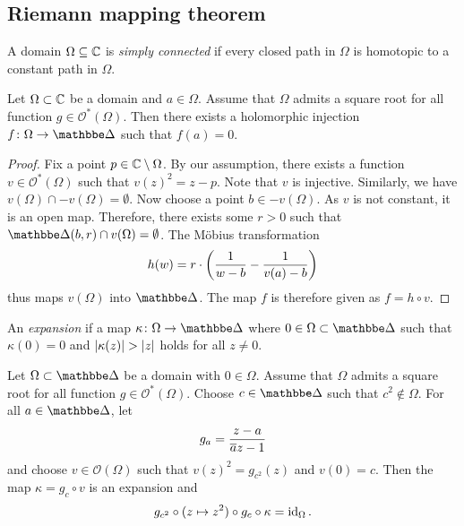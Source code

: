 \newpage

\subsection{Riemann mapping theorem}


\begin{definicija}
A domain $\Omega \subseteq \mathbb{C}$ is
\emph{simply connected} if every closed
path in $\Omega$ is homotopic to a constant path in $\Omega$.
\end{definicija}

\begin{lema}
\label{hol:lm:inj_exis}
Let $\Omega \subset \mathbb{C}$ be a domain and $a \in \Omega$. Assume that
$\Omega$ admits a square root for all function
$g \in \mathcal{O}^*(\Omega)$. Then there exists a holomorphic
injection $f \colon \Omega \to \dsk$ such that $f(a) = 0$.
\end{lema}

\begin{proof}
Fix a point $p \in \mathbb{C} \setminus \Omega$. By our assumption, there
exists a function $v \in \mathcal{O}^*(\Omega)$ such that
$v(z)^2 = z-p$. Note that $v$ is injective. Similarly, we have
$v(\Omega) \cap -v(\Omega) = \emptyset$. Now choose a point
$b \in -v(\Omega)$. As $v$ is not constant, it is an open map.
Therefore, there exists some $r > 0 $ such that
$\dsk(b, r) \cap v(\Omega) = \emptyset$. The Möbius transformation
\[
h(w) = r \cdot \left(\frac{1}{w-b} - \frac{1}{v(a)-b}\right)
\]
thus maps $v(\Omega)$ into $\dsk$. The map $f$ is therefore given
as $f = h \circ v$.
\end{proof}

\begin{definicija}
An \emph{expansion} if a map
$\kappa \colon \Omega \to \dsk$ where $0 \in \Omega \subset \dsk$
such that $\kappa(0) = 0$ and $\left\lvert \kappa(z)\right\rvert > \left\lvert z\right\rvert$ holds for
all $z \ne 0$.
\end{definicija}

\begin{lema}
Let $\Omega \subset \dsk$ be a domain with $0 \in \Omega$. Assume
that $\Omega$ admits a square root for all function
$g \in \mathcal{O}^*(\Omega)$. Choose $c \in \dsk$ such that
$c^2 \not \in \Omega$. For all $a \in \dsk$, let
\[
g_a = \frac{z - a}{\overline{a} z - 1}
\]
and choose $v \in \mathcal{O}(\Omega)$ such that
$v(z)^2 = g_{c^2}(z)$ and $v(0) = c$. Then the map
$\kappa = g_c \circ v$ is an expansion and
\[
g_{c^2} \circ (z \mapsto z^2) \circ g_c \circ \kappa =
\operatorname{id}_{\Omega}.
\]
\end{lema}

